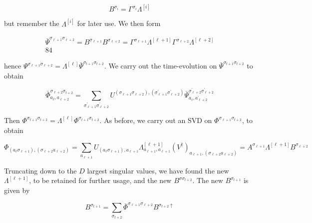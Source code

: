 \documentclass[12pt]{article}
\begin{document}
\begin{equation*}
B^{\sigma_{i}}=\Gamma^{\sigma_{i}} \Lambda^{[i]} \tag{270}
\end{equation*}


but remember the $\Lambda^{[i]}$ for later use. We then form


\begin{gather*}
\bar{\Psi}^{\sigma_{\ell+1} \sigma_{\ell+2}}=B^{\sigma_{\ell+1}} B^{\sigma_{\ell+2}}=\Gamma^{\sigma_{\ell+1}} \Lambda^{[\ell+1]} \Gamma^{\sigma_{\ell+2}} \Lambda^{[\ell+2]}  \tag{271}\\
84
\end{gather*}


hence $\Psi^{\sigma_{\ell+1} \sigma_{\ell+2}}=\Lambda^{[\ell]} \bar{\Psi}^{\sigma_{t+1} \sigma_{t+2}}$. We carry out the time-evolution on $\bar{\Psi}^{\sigma_{t+1} \sigma_{t+2}}$ to obtain


\begin{equation*}
\bar{\Phi}_{a_{\ell}, a_{\ell+2}}^{\sigma_{\ell+2} \sigma_{t+2}}=\sum_{\sigma_{\ell+1}^{\prime} \sigma_{\ell+2}^{\prime}} U^{\left(\sigma_{\ell+1} \sigma_{\ell+2}\right),\left(\sigma_{\ell+1}^{\prime} \sigma_{\ell+2}^{\prime}\right)} \bar{\Psi}_{a_{\ell}, a_{\ell+2}^{\prime}}^{\sigma_{\ell+2}^{\prime} \sigma_{\ell+2}^{\prime}} \tag{272}
\end{equation*}


Then $\Phi^{\sigma_{t+1} \sigma_{t+2}}=\Lambda^{[\ell]} \Phi^{\sigma_{t+1} \sigma_{t+2}}$. As before, we carry out an SVD on $\Phi^{\sigma_{\ell+1} \sigma_{t+2}}$, to obtain


\begin{equation*}
\Phi_{\left(a_{\ell} \sigma_{\ell+1}\right),\left(\sigma_{\ell+2} a_{\ell+2}\right)}=\sum_{a_{\ell+1}} U_{\left(a_{\ell} \sigma_{\ell+1}\right), a_{\ell+1}} \Lambda_{a_{\ell+1}, a_{\ell+1}}^{[\ell+1]}\left(V^{\dagger}\right)_{a_{\ell+1},\left(\sigma_{\ell+2} a_{\ell+2}\right)}=A^{\sigma_{\ell+1}} \Lambda^{[\ell+1]} B^{\sigma_{\ell+2}} \tag{273}
\end{equation*}


Truncating down to the $D$ largest singular values, we have found the new $\Lambda^{[\ell+1]}$, to be retained for further usage, and the new $B^{\sigma \sigma_{l+2}}$. The new $B^{\sigma_{l+1}}$ is given by


\begin{equation*}
B^{\sigma_{t+1}}=\sum_{\sigma_{t+2}} \bar{\Phi}^{\sigma_{\ell+1} \sigma_{\ell+2}} B^{\sigma_{t+2} \uparrow} \tag{274}
\end{equation*}
\end{document}
